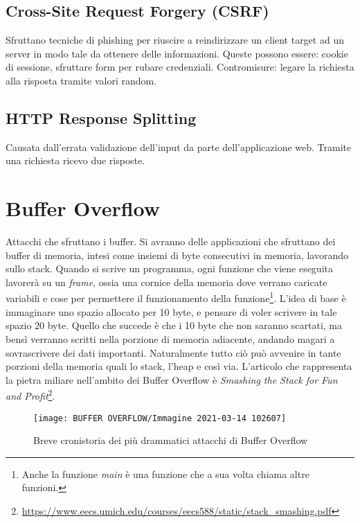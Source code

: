 \documentclass[14pt]{extreport}
\begin{document}
\section{Cross-Site Request Forgery (CSRF)}
Sfruttano tecniche di phishing per riuscire a reindirizzare un client target ad un server in modo tale da ottenere delle informazioni. Queste possono essere: cookie di sessione, sfruttare form per rubare credenziali.
Contromisure: legare la richiesta alla risposta tramite valori random.



\section{HTTP Response Splitting}
Causata dall'errata validazione dell'input da parte dell'applicazione web. Tramite una richiesta ricevo due risposte.











\chapter{Buffer Overflow}
Attacchi che sfruttano i buffer. Si avranno delle applicazioni che sfruttano dei buffer di memoria, intesi come insiemi di byte consecutivi in memoria, lavorando sullo stack. Quando si scrive un programma, ogni funzione che viene eseguita lavorerà su un \textit{frame}, ossia una cornice della memoria dove verrano caricate variabili e cose per permettere il funzionamento della funzione\footnote{Anche la funzione \textit{main} è una funzione che a sua volta chiama altre funzioni.}.
L'idea di base è immaginare uno spazio allocato per 10 byte, e pensare di voler scrivere in tale spazio 20 byte. Quello che succede è che i 10 byte che  non saranno scartati, ma bensì verranno scritti nella porzione di memoria adiacente, andando magari a sovrascrivere dei dati importanti. Naturalmente tutto ciò può avvenire in tante porzioni della memoria quali lo stack, l'heap e così via.
L'articolo che rappresenta la pietra miliare nell'ambito dei Buffer Overflow è \textit{Smashing the Stack for Fun and Profit}\footnote{\url{https://www.eecs.umich.edu/courses/eecs588/static/stack_smashing.pdf}}.




\begin{figure}[H]
    \centering
    \texttt{[image: BUFFER OVERFLOW/Immagine 2021-03-14 102607]}
    \caption{Breve cronistoria dei più drammatici attacchi di Buffer Overflow}
\end{figure}
\end{document}
